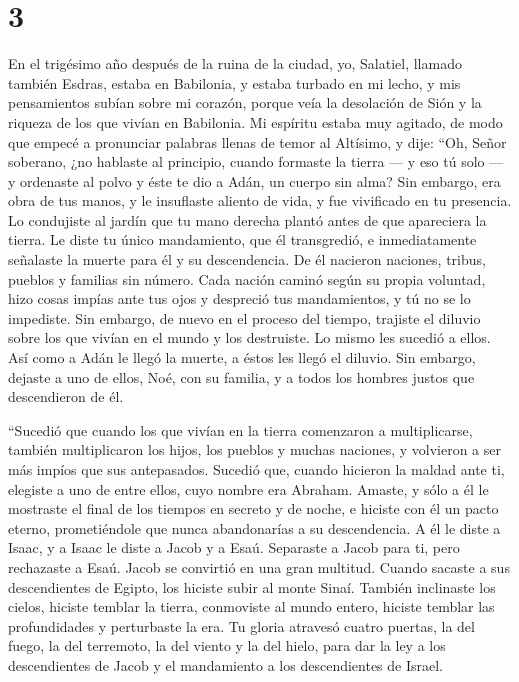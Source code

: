 \hypertarget{section-2}{%
\section{3}\label{section-2}}

 En el trigésimo año después de la ruina de la ciudad, yo,
Salatiel, llamado también Esdras, estaba en Babilonia, y estaba turbado
en mi lecho, y mis pensamientos subían sobre mi corazón, 
porque veía la desolación de Sión y la riqueza de los que vivían en
Babilonia.  Mi espíritu estaba muy agitado, de modo que
empecé a pronunciar palabras llenas de temor al Altísimo, y dije:
 ``Oh, Señor soberano, ¿no hablaste al principio, cuando
formaste la tierra --- y eso tú solo --- y ordenaste al polvo
 y éste te dio a Adán, un cuerpo sin alma? Sin embargo,
era obra de tus manos, y le insuflaste aliento de vida, y fue vivificado
en tu presencia.  Lo condujiste al jardín que tu mano
derecha plantó antes de que apareciera la tierra.  Le
diste tu único mandamiento, que él transgredió, e inmediatamente
señalaste la muerte para él y su descendencia. De él nacieron naciones,
tribus, pueblos y familias sin número.  Cada nación caminó
según su propia voluntad, hizo cosas impías ante tus ojos y despreció
tus mandamientos, y tú no se lo impediste.  Sin embargo,
de nuevo en el proceso del tiempo, trajiste el diluvio sobre los que
vivían en el mundo y los destruiste.  Lo mismo les
sucedió a ellos. Así como a Adán le llegó la muerte, a éstos les llegó
el diluvio.  Sin embargo, dejaste a uno de ellos, Noé,
con su familia, y a todos los hombres justos que descendieron de él.

 ``Sucedió que cuando los que vivían en la tierra
comenzaron a multiplicarse, también multiplicaron los hijos, los pueblos
y muchas naciones, y volvieron a ser más impíos que sus antepasados.
 Sucedió que, cuando hicieron la maldad ante ti, elegiste
a uno de entre ellos, cuyo nombre era Abraham.  Amaste, y
sólo a él le mostraste el final de los tiempos en secreto y de noche,
 e hiciste con él un pacto eterno, prometiéndole que
nunca abandonarías a su descendencia. A él le diste a Isaac, y a Isaac
le diste a Jacob y a Esaú.  Separaste a Jacob para ti,
pero rechazaste a Esaú. Jacob se convirtió en una gran multitud.
 Cuando sacaste a sus descendientes de Egipto, los
hiciste subir al monte Sinaí.  También inclinaste los
cielos, hiciste temblar la tierra, conmoviste al mundo entero, hiciste
temblar las profundidades y perturbaste la era.  Tu
gloria atravesó cuatro puertas, la del fuego, la del terremoto, la del
viento y la del hielo, para dar la ley a los descendientes de Jacob y el
mandamiento a los descendientes de Israel.

